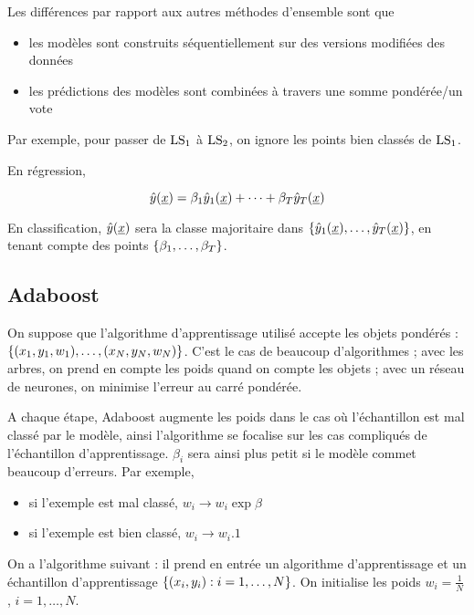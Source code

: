 Les différences par rapport aux autres méthodes d'ensemble sont que

\begin{itemize}
	\item les modèles sont construits séquentiellement sur des versions modifiées des données
	\item les prédictions des modèles sont combinées à travers une somme pondérée/un vote
\end{itemize}


Par exemple, pour passer de $\text{LS}_1$ à $\text{LS}_2$, on ignore les points bien classés de $\text{LS}_1$.

En régression,

$$\hat{y}(\underline{x}) = \beta_1\hat{y}_1(\underline{x}) + \dots + \beta_T \hat{y}_T(\underline{x})$$

En classification, $\hat{y}(\underline{x})$ sera la classe majoritaire dans $\lbrace \hat{y}_1(\underline{x}), \dots , \hat{y}_T(\underline{x}) \rbrace$, en tenant compte des points $\lbrace \beta_1, \dots , \beta_T \rbrace$.

	\subsection{Adaboost}
	
	On suppose que l'algorithme d'apprentissage utilisé accepte les objets pondérés : $\lbrace (x_1, y_1, w_1), \dots , (x_N, y_N, w_N) \rbrace$. C'est le cas de beaucoup d'algorithmes ; avec les arbres, on prend en compte les poids quand on compte les objets ; avec un réseau de neurones, on minimise l'erreur au carré pondérée.
	
	A chaque étape, Adaboost augmente les poids dans le cas où l'échantillon est mal classé par le modèle, ainsi l'algorithme se focalise sur les cas compliqués de l'échantillon d'apprentissage. $\beta_i$ sera ainsi plus petit si le modèle commet beaucoup d'erreurs. Par exemple,
	
	\begin{itemize}
		\item si l'exemple est mal classé, $w_i \rightarrow w_i \exp{\beta}$
		\item si l'exemple est bien classé, $w_i \rightarrow w_i . 1$
	\end{itemize}
	
	On a l'algorithme suivant : il prend en entrée un algorithme d'apprentissage et un échantillon d'apprentissage $\lbrace (x_i, y_i) : i = 1, \dots , N \rbrace$. On initialise les poids $w_i = \frac{1}{N}$, $i = 1 , \dots , N$.
	
